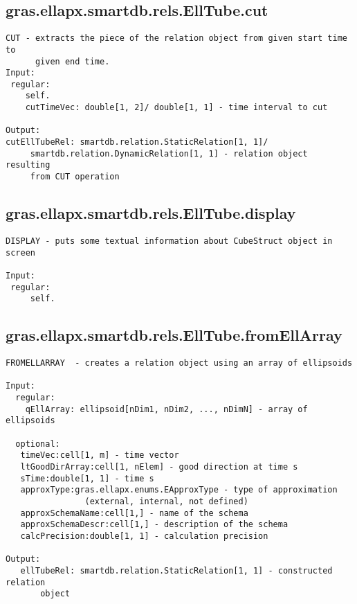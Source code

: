 \subsection{\texorpdfstring{gras.ellapx.smartdb.rels.EllTube.cut}{cut}}\label{method:gras.ellapx.smartdb.rels.EllTube.cut}
\begin{verbatim}
CUT - extracts the piece of the relation object from given start time to
      given end time.
Input:
 regular:
    self.
    cutTimeVec: double[1, 2]/ double[1, 1] - time interval to cut

Output:
cutEllTubeRel: smartdb.relation.StaticRelation[1, 1]/
     smartdb.relation.DynamicRelation[1, 1] - relation object resulting
     from CUT operation
\end{verbatim}
\subsection{\texorpdfstring{gras.ellapx.smartdb.rels.EllTube.display}{display}}\label{method:gras.ellapx.smartdb.rels.EllTube.display}
\begin{verbatim}
DISPLAY - puts some textual information about CubeStruct object in screen

Input:
 regular:
     self.
\end{verbatim}
\subsection{\texorpdfstring{gras.ellapx.smartdb.rels.EllTube.fromEllArray}{fromEllArray}}\label{method:gras.ellapx.smartdb.rels.EllTube.fromEllArray}
\begin{verbatim}
FROMELLARRAY  - creates a relation object using an array of ellipsoids

Input:
  regular:
    qEllArray: ellipsoid[nDim1, nDim2, ..., nDimN] - array of ellipsoids

  optional:
   timeVec:cell[1, m] - time vector
   ltGoodDirArray:cell[1, nElem] - good direction at time s
   sTime:double[1, 1] - time s
   approxType:gras.ellapx.enums.EApproxType - type of approximation
                (external, internal, not defined)
   approxSchemaName:cell[1,] - name of the schema
   approxSchemaDescr:cell[1,] - description of the schema
   calcPrecision:double[1, 1] - calculation precision

Output:
   ellTubeRel: smartdb.relation.StaticRelation[1, 1] - constructed relation
       object
\end{verbatim}
